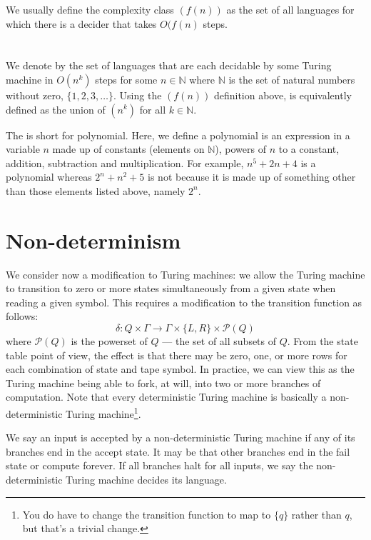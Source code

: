 \documentclass{iansnotes}
\begin{document}
  We usually define the complexity class \((f(n)) \) as the set of all languages for which there is a decider that takes \( O(f(n) \) steps.

\section{}
  We denote by  the set of languages that are each decidable by some Turing machine in \( O(n^k) \) steps for some \( n \in \mathbb{N} \) where \( \mathbb{N} \) is the set of natural numbers without zero, \( \{ 1, 2, 3, \ldots\} \).
  Using the \((f(n)) \) definition above,  is equivalently defined as the union of \((n^k)\) for all \( k \in \mathbb{N} \).
  
  The  is short for polynomial.
  Here, we define a polynomial is an expression in a variable \( n \) made up of constants (elements on \( \mathbb{N}\)), powers of \( n \) to a constant, addition, subtraction and multiplication.
  For example, \( n^5 + 2n + 4 \) is a polynomial whereas \( 2^n + n^2 + 5 \) is not because it is made up of something other than those elements listed above, namely \( 2^n \).



\section{Non-determinism}
  \label{sect:nondet}
  We consider now a modification to Turing machines: we allow the Turing machine to transition to zero or more states simultaneously from a given state when reading a given symbol.
  This requires a modification to the transition function as follows:
   \[ \delta: Q \times \Gamma \rightarrow \Gamma \times \{ L, R \} \times \mathcal{P}(Q) \]
   where \( \mathcal{P}(Q) \) is the powerset of \( Q \) --- the set of all subsets of \( Q \).
  From the state table point of view, the effect is that there may be zero, one, or more rows for each combination of state and tape symbol.
  In practice, we can view this as the Turing machine being able to fork, at will, into two or more branches of computation.
  Note that every deterministic Turing machine is basically a non-deterministic Turing machine\footnote{You do have to change the transition function to map to \( \{ q \} \) rather than \( q \), but that's a trivial change.}.

  We say an input is accepted by a non-deterministic Turing machine if any of its branches end in the accept state.
  It may be that other branches end in the fail state or compute forever.
  If all branches halt for all inputs, we say the non-deterministic Turing machine decides its language.
\end{document}
